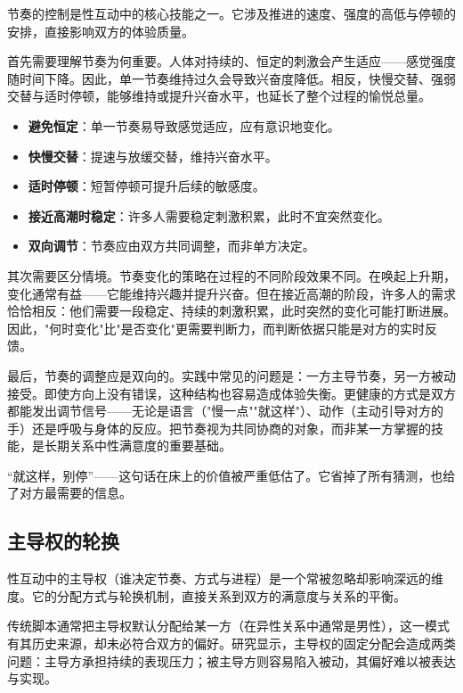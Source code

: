\documentclass[12pt,UTF8]{ctexbook}
\newcommand{\keyword}[1]{\textbf{#1}}
\begin{document}
节奏的控制是性互动中的核心技能之一。它涉及推进的速度、强度的高低与停顿的安排，直接影响双方的体验质量。

首先需要理解节奏为何重要。人体对持续的、恒定的刺激会产生适应——感觉强度随时间下降。因此，单一节奏维持过久会导致兴奋度降低。相反，快慢交替、强弱交替与适时停顿，能够维持或提升兴奋水平，也延长了整个过程的愉悦总量。

\begin{itemize}
  \item \keyword{避免恒定}：单一节奏易导致感觉适应，应有意识地变化。
  \item \keyword{快慢交替}：提速与放缓交替，维持兴奋水平。
  \item \keyword{适时停顿}：短暂停顿可提升后续的敏感度。
  \item \keyword{接近高潮时稳定}：许多人需要稳定刺激积累，此时不宜突然变化。
  \item \keyword{双向调节}：节奏应由双方共同调整，而非单方决定。
\end{itemize}

其次需要区分情境。节奏变化的策略在过程的不同阶段效果不同。在唤起上升期，变化通常有益——它能维持兴趣并提升兴奋。但在接近高潮的阶段，许多人的需求恰恰相反：他们需要一段稳定、持续的刺激积累，此时突然的变化可能打断进展。因此，"何时变化"比"是否变化"更需要判断力，而判断依据只能是对方的实时反馈。

最后，节奏的调整应是双向的。实践中常见的问题是：一方主导节奏，另一方被动接受。即使方向上没有错误，这种结构也容易造成体验失衡。更健康的方式是双方都能发出调节信号——无论是语言（"慢一点""就这样"）、动作（主动引导对方的手）还是呼吸与身体的反应。把节奏视为共同协商的对象，而非某一方掌握的技能，是长期关系中性满意度的重要基础。

\begin{tcolorbox}[colback=pink!5!white,colframe=red!50!black,title=贴心小叮咛]
“就这样，别停”——这句话在床上的价值被严重低估了。它省掉了所有猜测，也给了对方最需要的信息。
\end{tcolorbox}
\subsection{主导权的轮换}

性互动中的主导权（谁决定节奏、方式与进程）是一个常被忽略却影响深远的维度。它的分配方式与轮换机制，直接关系到双方的满意度与关系的平衡。

传统脚本通常把主导权默认分配给某一方（在异性关系中通常是男性），这一模式有其历史来源，却未必符合双方的偏好。研究显示，主导权的固定分配会造成两类问题：主导方承担持续的表现压力；被主导方则容易陷入被动，其偏好难以被表达与实现。
\end{document}
